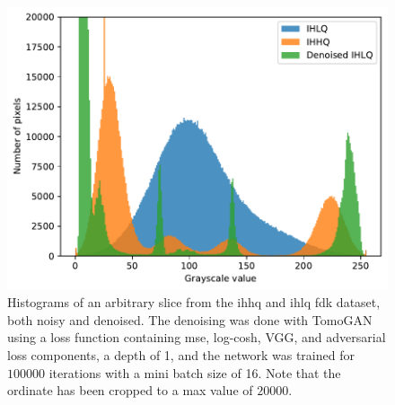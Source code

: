 \begin{figure}[htbp]
  \centering
  \includegraphics[width=.85\textwidth]{figures/kimroberthist.pdf}
  \caption[Histograms of IHHQ and IHLQ, noisy and denoised]{Histograms of an arbitrary slice from the \gls{ihhq} and \gls{ihlq} \gls{fdk} dataset, both noisy and denoised. The denoising was done with TomoGAN using a loss function containing \gls{mse}, log-cosh, VGG, and adversarial loss components, a depth of 1, and the network was trained for $100 000$ iterations with a mini batch size of 16. Note that the ordinate has been cropped to a max value of $20000$. }
  \label{fig:kimroberthist}
\end{figure}

